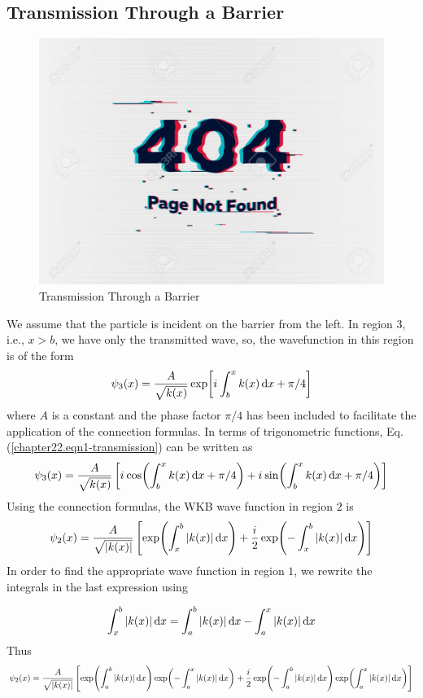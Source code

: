 \subsection{Transmission Through a Barrier}
\begin{figure}
	\centering
	\includegraphics[width=0.5\linewidth]{Pictures/not-found.jpg}
	\caption{Transmission Through a Barrier}
	\label{chapter22.fig5}
\end{figure}
We assume that the particle is incident on the barrier from the left. In region $3$, i.e., $x>b$, we have only the transmitted wave, so, the wavefunction in this region is of the form
\begin{equation}
	\label{chapter22.eqn1-transmission}
	\psi_3\qty(x) = \frac{A}{\sqrt{k(x)}} \exp[{i\mkern1mu} \int_{b}^{x} k(x) \dd{x} + \pi/ 4]
\end{equation}
where $A$ is a constant and the phase factor $\pi/4$
has been included to facilitate the application of the connection formulas. In terms of trigonometric functions, Eq. (\ref{chapter22.eqn1-transmission}) can be written as
\begin{equation}
\label{chapter22.eqn2-transmission}
\psi_3\qty(x) = \frac{A}{\sqrt{k(x)}} \left[{i\mkern1mu} \cos(\int_{b}^{x} k(x) \dd{x} + \pi/ 4) + {i\mkern1mu} \sin(\int_{b}^{x} k(x) \dd{x} + \pi/ 4)\right]
\end{equation}
Using the connection formulas, the WKB wave function in region $2$ is
\begin{equation}
\label{chapter22.eqn3-transmission}
\psi_2(x) = \frac{A}{\sqrt{\abs{k(x)}}} \left[
\exp(\int_{x}^{b} \abs{k(x)} \dd{x}) + \frac{{i\mkern1mu}}{2} \exp(-\int_{x}^{b} \abs{k(x)} \dd{x})
\right]
\end{equation}
In order to find the appropriate wave function in region $1$, we rewrite the integrals in the last expression using

\begin{equation}
\label{chapter22.eqn4-transmission}
\int_{x}^{b} \abs{k(x)} \dd{x} = \int_{a}^{b} \abs{k(x)} \dd{x} - \int_{a}^{x} \abs{k(x)} \dd{x}
\end{equation}
Thus
\begin{equation}
\label{chapter22.eqn5-transmission}
\psi_2(x) = \frac{A}{\sqrt{\abs{k(x)}}} \left[
\exp(\int_{a}^{b} \abs{k(x)} \dd{x})\exp(-\int_{a}^{x} \abs{k(x)} \dd{x})
 +
  \frac{{i\mkern1mu}}{2} \exp(-\int_{a}^{b} \abs{k(x)} \dd{x})\exp(\int_{a}^{x} \abs{k(x)} \dd{x})
\right]
\end{equation}

